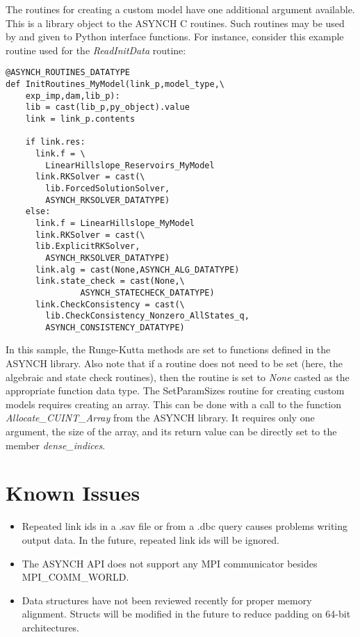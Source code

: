 \documentclass[12pt]{article}
\begin{document}
The routines for creating a custom model have one additional argument available. This is a library object to the ASYNCH C routines. Such routines may be used by and given to Python interface functions. For instance, consider this example routine used for the \emph{ReadInitData} routine:
\begin{lstlisting}[style=PythonStyle]
@ASYNCH_ROUTINES_DATATYPE
def InitRoutines_MyModel(link_p,model_type,\
    exp_imp,dam,lib_p):
	lib = cast(lib_p,py_object).value
	link = link_p.contents

	if link.res:
	  link.f = \
	    LinearHillslope_Reservoirs_MyModel
	  link.RKSolver = cast(\
	    lib.ForcedSolutionSolver,
	    ASYNCH_RKSOLVER_DATATYPE)
	else:
	  link.f = LinearHillslope_MyModel
	  link.RKSolver = cast(\
	  lib.ExplicitRKSolver,
	    ASYNCH_RKSOLVER_DATATYPE)
	  link.alg = cast(None,ASYNCH_ALG_DATATYPE)
	  link.state_check = cast(None,\
			   ASYNCH_STATECHECK_DATATYPE)
	  link.CheckConsistency = cast(\
	    lib.CheckConsistency_Nonzero_AllStates_q,
	    ASYNCH_CONSISTENCY_DATATYPE)
\end{lstlisting}
In this sample, the Runge-Kutta methods are set to functions defined in the ASYNCH library. Also note that if a routine does not need to be set (here, the algebraic and state check routines), then the routine is set to \emph{None} casted as the appropriate function data type. The SetParamSizes routine for creating custom models requires creating an array. This can be done with a call to the function \emph{Allocate\_CUINT\_Array} from the ASYNCH library. It requires only one argument, the size of the array, and its return value can be directly set to the member \emph{dense\_indices}.


\section{Known Issues} \label{sec: known issues}

\begin{itemize}
 \item Repeated link ids in a .sav file or from a .dbc query causes problems writing output data. In the future, repeated link ids will be ignored.
 \item The ASYNCH API does not support any MPI communicator besides MPI\_COMM\_WORLD.
 \item Data structures have not been reviewed recently for proper memory alignment. Structs will be modified in the future to reduce padding on 64-bit architectures.
\end{itemize}
\end{document}
